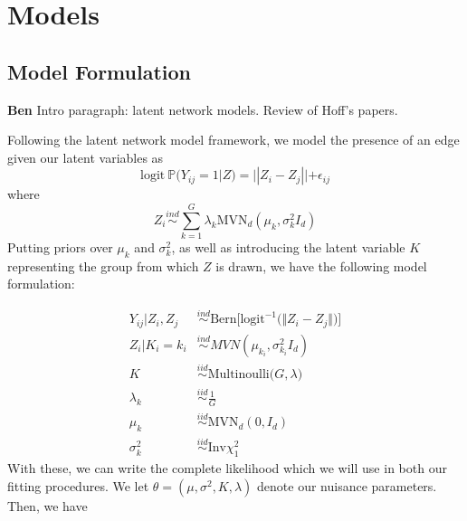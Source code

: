 \documentclass{article}
\begin{document}
\section{Models} \label{Models}


\subsection{Model Formulation}\label{Model Formulation}

\textbf{Ben} Intro paragraph: latent network models. Review of Hoff's papers. 

Following the latent network model framework, we model the presence of an edge given our latent variables as
\[\text{logit} \ \mathbb{P}(Y_{ij} = 1|Z) = ||Z_i - Z_j|| + \epsilon_{ij}\]
where
\[Z_i \overset{ind}{\sim}\sum_{k=1}^G \lambda_k\text{MVN}_d(\mu_k,\sigma_k^2I_d)\]
Putting priors over $\mu_k$ and  $\sigma_k^2$, as well as introducing the latent variable $K$ representing the group from which $Z$ is drawn, we have the following model formulation:

\begin{align*}
Y_{ij} | Z_i, Z_j &\overset{ind}\sim \text{Bern}\Big[\text{logit}^{-1}\big(\Vert Z_i - Z_j \Vert\big)\Big] \\
Z_i | K_i = k_i &\overset{ind}\sim MVN(\mu_{k_i}, \sigma_{k_i}^2 I_d) \\
K &\overset{iid}\sim \text{Multinoulli}\big(G, \lambda \big) \\
\lambda_k &\overset{iid}\sim \frac{1}{G} \\
\mu_k &\overset{iid}\sim \text{MVN}_d(0, I_d) \\
\sigma_k^2 &\overset{iid}\sim \text{Inv} \chi^2_1
\end{align*}
With these, we can write the complete likelihood which we will use in both our fitting procedures. We let $\theta = (\mu, \sigma^2, K, \lambda)$ denote our nuisance parameters. Then, we have
\end{document}
